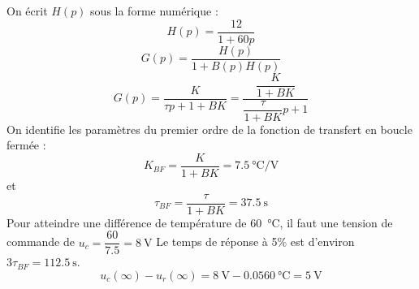 On écrit $H(p)$ sous la forme numérique :
\[
    H(p)=\dfrac{12}{1+60p}
\]
\question{}
\[
    G(p)=\dfrac{H(p)}{1+B(p)H(p)}
\]
\[
    G(p)=\dfrac{K}{\tau p+1+BK}=\dfrac{\dfrac{K}{1+BK}}{\dfrac{\tau}{1+BK}p+1}
\]
On identifie les paramètres du premier ordre de la fonction de transfert en 
boucle fermée :
\[
    K_{BF}=\dfrac{K}{1+BK}=\SI{7.5}{\celsius\per\volt}
\]
et
\[
    \tau_{BF}=\dfrac{\tau}{1+BK}=\SI{37.5}{\second}
\]
\question{}
Pour atteindre une différence de température de \SI{60}{\celsius}, il faut une 
tension de commande de $u_c=\dfrac{60}{7.5}=\SI{8}{\volt}$
Le temps de réponse à 5\% est d'environ $3\tau_{BF}=\SI{112.5}{\second}$.
\question{}
\[
    u_c(\infty)-u_r(\infty)=\SI{8}{\volt}-0.05\SI{60}{\celsius}=\SI{5}{\volt}
\]
